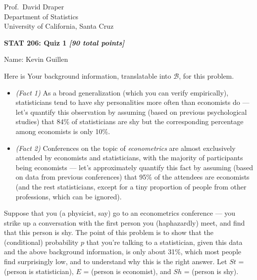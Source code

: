 \documentclass[12pt]{article}
\begin{document}
\vspace*{-0.3in}

\begin{flushleft}

Prof.~David Draper \\
Department of Statistics \\
University of California, Santa Cruz

\end{flushleft}

\begin{center}

\textbf{\large STAT 206: Quiz 1 \textit{[90 total points]}}

\end{center}

\begin{flushleft}

Name: Kevin Guillen \underline{\hspace*{5.85in}}

\end{flushleft}

Here is Your background information, translatable into $\mathcal{ B }$, for this problem.

\begin{itemize}

\item

\textit{(Fact 1)} As a broad generalization (which you can verify empirically), statisticians tend to have shy personalities more often than economists do --- let's quantify this observation by assuming (based on previous psychological studies) that 84\% of statisticians are shy but the corresponding percentage among economists is only 10\%. 

\item

\textit{(Fact 2)} Conferences on the topic of \textit{econometrics} are almost exclusively attended by economists and statisticians, with the majority of participants being economists --- let's approximately quantify this fact by assuming (based on data from previous conferences) that 95\% of the attendees are economists (and the rest statisticians, except for a tiny proportion of people from other professions, which can be ignored). 

\end{itemize}

Suppose that you (a physicist, say) go to an econometrics conference --- you strike up a conversation with the first person you (haphazardly) meet, and find that this person is shy. The point of this problem is to show that the (conditional) probability $p$ that you're talking to a statistician, given this data and the above background information, is only about 31\%, which most people find surprisingly low, and to understand why this is the right answer. Let $St$ = (person is statistician), $E$ = (person is economist), and $Sh$ = (person is shy).
\end{document}

